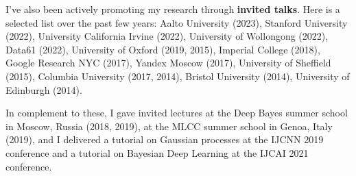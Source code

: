 \documentclass[oneside, a4paper, onecolumn, 10pt]{article}
\begin{document}
I've also been actively promoting my research through {\bf invited talks}. 
Here is a selected list over the past few years:
Aalto University (2023), Stanford University (2022), University California Irvine (2022), University of Wollongong (2022), Data61 (2022), University of Oxford (2019, 2015), Imperial College (2018), Google Research NYC (2017), Yandex Moscow (2017), University of Sheffield (2015), Columbia University (2017, 2014), Bristol University (2014), University of Edinburgh (2014). %

In complement to these, I gave invited lectures at the Deep Bayes summer school in Moscow, Russia (2018, 2019), at the MLCC summer school in Genoa, Italy (2019),
and I delivered a tutorial on Gaussian processes at the IJCNN 2019 conference and a tutorial on Bayesian Deep Learning at the IJCAI 2021 conference. 




\end{document}
